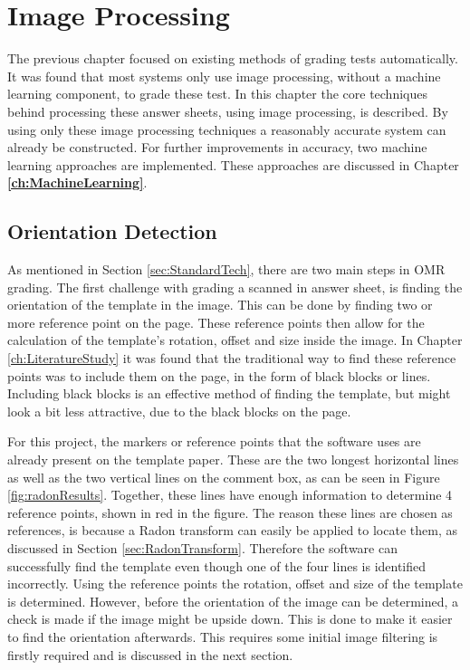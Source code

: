 \chapter{Image Processing}
\label{ch:ImageProcessing}
\graphicspath{{Chapter3/Chapter3Figures/}}
The previous chapter focused on existing methods of grading tests automatically. It was found that most systems only use image processing, without a machine learning component, to grade these test. In this chapter the core techniques behind processing these answer sheets, using image processing, is described. By using only these image processing techniques a reasonably accurate system can already be constructed. For further improvements in accuracy, two machine learning approaches are implemented. These approaches are discussed in Chapter \textbf{\ref{ch:MachineLearning}}.

\section{Orientation Detection}
\label{sec:orientDetect}
As mentioned in Section \ref{sec:StandardTech}, there are two main steps in OMR grading. The first challenge with grading a scanned in answer sheet, is finding the orientation of the template in the image. This can be done by finding two or more reference point on the page. These reference points then allow for the calculation of the template's rotation, offset and size inside the image. In Chapter \ref{ch:LiteratureStudy} it was found that the traditional way to find these reference points was to include them on the page, in the form of black blocks or lines. Including black blocks is an effective method of finding the template, but might look a bit less attractive, due to the black blocks on the page.

For this project, the markers or reference points that the software uses are already present on the template paper. These are the two longest horizontal lines as well as the two vertical lines on the comment box, as can be seen in Figure \ref{fig:radonResults}. Together, these lines have enough information to determine 4 reference points, shown in red in the figure. The reason these lines are chosen as references, is because a Radon transform can easily be applied to locate them, as discussed in Section \ref{sec:RadonTransform}. Therefore the software can successfully find the template even though one of the four lines is identified incorrectly. Using the reference points the rotation, offset and size of the template is determined. However, before the orientation of the image can be determined, a check is made if the image might be upside down. This is done to make it easier to find the orientation afterwards. This requires some initial image filtering is firstly required and is discussed in the next section.

